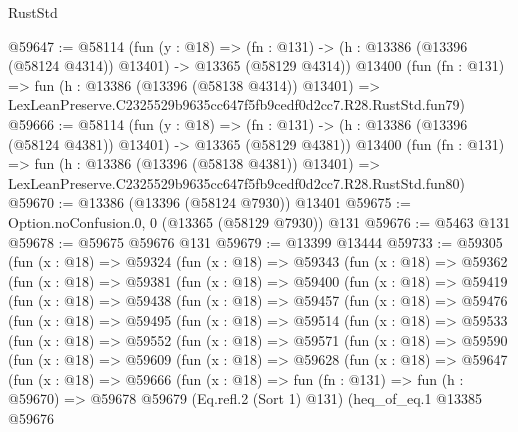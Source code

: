 \begin{lexlean}{RustStd}
\begin{coremodule}
@59647 := @58114
    (fun (y : @18) =>
    (fn : @131) -> (h : @13386 (@13396 (@58124 @4314)) @13401) -> @13365 (@58129 @4314))
    @13400
    (fun (fn : @131) =>
    fun (h : @13386 (@13396 (@58138 @4314)) @13401) =>
    LexLeanPreserve.C2325529b9635cc647f5fb9cedf0d2cc7.R28.RustStd.fun79)
@59666 := @58114
    (fun (y : @18) =>
    (fn : @131) -> (h : @13386 (@13396 (@58124 @4381)) @13401) -> @13365 (@58129 @4381))
    @13400
    (fun (fn : @131) =>
    fun (h : @13386 (@13396 (@58138 @4381)) @13401) =>
    LexLeanPreserve.C2325529b9635cc647f5fb9cedf0d2cc7.R28.RustStd.fun80)
@59670 := @13386 (@13396 (@58124 @7930)) @13401
@59675 := Option.noConfusion.{0, 0} (@13365 (@58129 @7930)) @131
@59676 := @5463 @131
@59678 := @59675 @59676 @131
@59679 := @13399 @13444
@59733 := @59305
    (fun (x : @18) =>
    @59324
      (fun (x : @18) =>
      @59343
        (fun (x : @18) =>
        @59362
          (fun (x : @18) =>
          @59381
            (fun (x : @18) =>
            @59400
              (fun (x : @18) =>
              @59419
                (fun (x : @18) =>
                @59438
                  (fun (x : @18) =>
                  @59457
                    (fun (x : @18) =>
                    @59476
                      (fun (x : @18) =>
                      @59495
                        (fun (x : @18) =>
                        @59514
                          (fun (x : @18) =>
                          @59533
                            (fun (x : @18) =>
                            @59552
                              (fun (x : @18) =>
                              @59571
                                (fun (x : @18) =>
                                @59590
                                  (fun (x : @18) =>
                                  @59609
                                    (fun (x : @18) =>
                                    @59628
                                      (fun (x : @18) =>
                                      @59647
                                        (fun (x : @18) =>
                                        @59666
                                          (fun (x : @18) =>
                                          fun (fn : @131) =>
                                          fun (h : @59670) =>
                                          @59678
                                            @59679
                                            (Eq.refl.{2} (Sort 1) @131)
                                            (heq_of_eq.{1}
                                              @13385
                                              @59676

\end{coremodule}
\end{lexlean}
